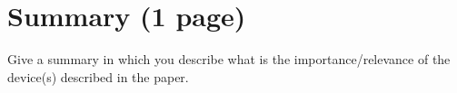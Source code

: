 \section{Summary (1 page)}
Give a summary  in which you describe what is the importance/relevance of the device(s) described in the paper.
